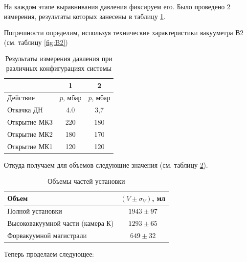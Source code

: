 \documentclass[12pt,a4paper]{article}
\begin{document}
На каждом этапе выравнивания давления фиксируем его. Было проведено 2 измерения, результаты которых занесены в таблицу \ref{tab:press}.

Погрешности определим, используя технические характеристики вакууметра В2 (см. таблицу \ref{fig:B2})



\begin{table}[h]
	\caption{Результаты измерения давления при различных конфигурациях системы}
	\label{tab:press}
	\begin{center}
		\begin{tabular}{lcc}
			\toprule
			{ } & 1 & 2 \\ \midrule
			Действие & $p$, мбар & $p$, мбар  \\ \midrule
			Откачка ДН           & 4.0            & 3,7          	   \\ 
			Открытие МК3         & 220            & 180             \\ 
			Открытие МК2         & 180            & 170             \\ 
			Открытие МК1         & 120            & 120            \\ 
			\bottomrule
		\end{tabular}
	\end{center}
\end{table}


Откуда получаем для объемов следующие значения (см. таблицу \ref{tab:volumes}).
\begin{table}[H]
	\caption{Объемы частей установки}
	\label{tab:volumes}
	\begin{center}
		\begin{tabular}{lc}
			\toprule
			Объем & $(V \pm \sigma_V)$, мл\\ \midrule
			Полной установки           & $1943 \pm 97$  \\ 
			Высоковакуумной части (камера К)         & $1293 \pm 65$ \\ 
			Форвакуумной магистрали         & $649 \pm 32$ \\ 
			\bottomrule
		\end{tabular}
	\end{center}
\end{table}



Теперь проделаем следующее:
\end{document}
